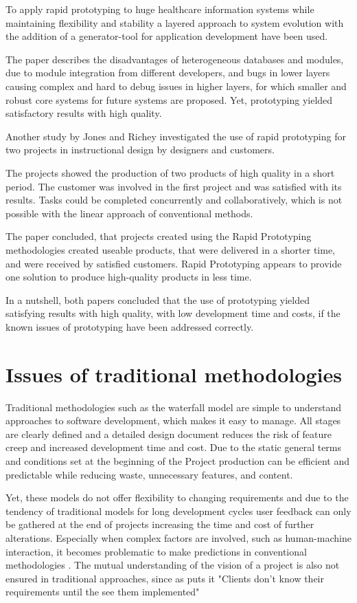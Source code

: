 \documentclass[runningheads]{llncs}
\begin{document}
To apply rapid prototyping to huge healthcare information systems while maintaining flexibility and stability
a layered approach to system evolution with the addition of a generator-tool for application development 
have been used. 

The paper describes the disadvantages of heterogeneous databases and modules, due to module integration
from different developers, and bugs in lower layers causing complex and hard to debug issues in higher layers, 
for which smaller and robust core systems for future systems are proposed. Yet, prototyping yielded 
satisfactory results with high quality.

Another study by Jones and Richey \cite{ref_RPInAction} investigated the use of rapid prototyping for 
two projects in instructional design by designers and customers. 

The projects showed the production of two products of high quality in a short period. The customer
was involved in the first project and was satisfied with its results. Tasks could be completed concurrently
and collaboratively, which is not possible with the linear approach of conventional methods.

The paper concluded, that projects created using the Rapid Prototyping methodologies created useable products, that were 
delivered in a shorter time, and were received by satisfied customers. Rapid Prototyping appears to provide one solution 
to produce high-quality products in less time.

In a nutshell, both papers concluded that the use of prototyping yielded satisfying results with high quality, with low
development time and costs, if the known issues of prototyping have been addressed correctly.

\section{Issues of traditional methodologies}
Traditional methodologies such as the waterfall model \cite{ref_waterfall} 
are simple to understand approaches to software development, which makes it 
easy to manage. All stages are clearly defined and a detailed design document
reduces the risk of feature creep and increased development time and cost.
Due to the static general terms and conditions set at the beginning of the Project
production can be efficient and predictable while reducing waste, unnecessary features,
and content.

Yet, these models do not offer flexibility to changing requirements and due to the tendency of 
traditional models for long development cycles user feedback can only be gathered at the end 
of projects \cite{ref_health} increasing the time and cost of further 
alterations. Especially when complex factors are involved, such as human-machine interaction,
it becomes problematic to make predictions in conventional methodologies \cite{ref_RPalternativeStrategy}. 
The mutual understanding of the vision of a project is also not ensured in traditional approaches, 
since as \cite{ref_RPalternativeStrategy}
puts it "Clients don't know their requirements until the see them implemented"
\end{document}
